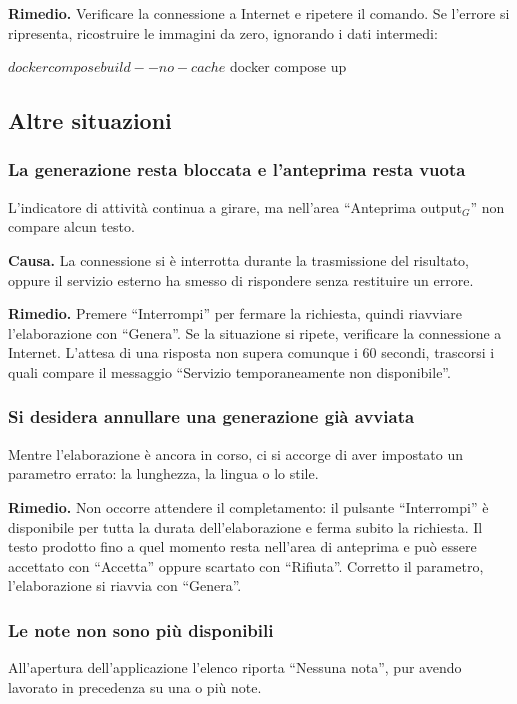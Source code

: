 \documentclass[a4paper, 10pt]{article}
\begin{document}
\textbf{Rimedio.} Verificare la connessione a Internet e ripetere il comando. Se l'errore si ripresenta, ricostruire le immagini da zero, ignorando i dati intermedi:

\begin{comando}
$ docker compose build --no-cache
$ docker compose up
\end{comando}

\subsection{Altre situazioni}
\label{sec:altre-situazioni}

\subsubsection{La generazione resta bloccata e l'anteprima resta vuota}
L'indicatore di attività continua a girare, ma nell'area ``Anteprima output$_G$'' non compare alcun testo.

\textbf{Causa.} La connessione si è interrotta durante la trasmissione del risultato, oppure il servizio esterno ha smesso di rispondere senza restituire un errore.

\textbf{Rimedio.} Premere ``Interrompi'' per fermare la richiesta, quindi riavviare l'elaborazione con ``Genera''. Se la situazione si ripete, verificare la connessione a Internet. L'attesa di una risposta non supera comunque i 60 secondi, trascorsi i quali compare il messaggio ``Servizio temporaneamente non disponibile''.

\subsubsection{Si desidera annullare una generazione già avviata}
Mentre l'elaborazione è ancora in corso, ci si accorge di aver impostato un parametro errato: la lunghezza, la lingua o lo stile.

\textbf{Rimedio.} Non occorre attendere il completamento: il pulsante ``Interrompi'' è disponibile per tutta la durata dell'elaborazione e ferma subito la richiesta. Il testo prodotto fino a quel momento resta nell'area di anteprima e può essere accettato con ``Accetta'' oppure scartato con ``Rifiuta''. Corretto il parametro, l'elaborazione si riavvia con ``Genera''.

\subsubsection{Le note non sono più disponibili}
All'apertura dell'applicazione l'elenco riporta ``Nessuna nota'', pur avendo lavorato in precedenza su una o più note.
\end{document}
